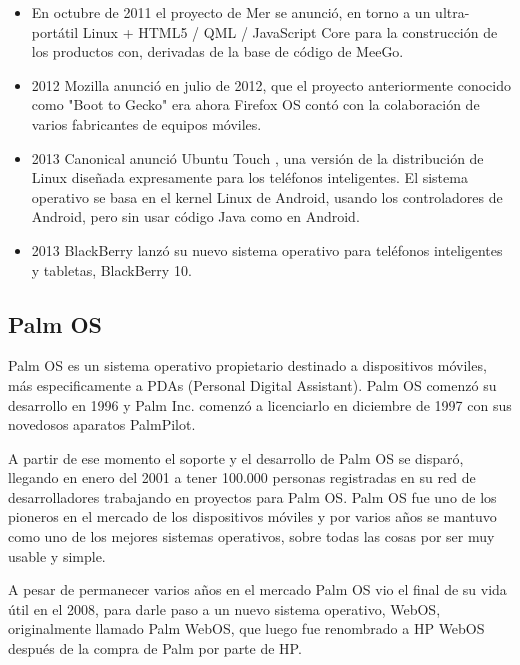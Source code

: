 \begin{itemize}
	\item En octubre de 2011 el proyecto de Mer se anunció, en torno a un ultra-portátil Linux + HTML5 / QML / JavaScript Core para la construcción de los productos con, 	
			derivadas de la base de código de MeeGo. 
	\item 2012 Mozilla anunció en julio de 2012, que el proyecto anteriormente conocido como "Boot to Gecko" era ahora Firefox OS contó con la colaboración de varios 		
			fabricantes de equipos móviles.
	\item 2013 Canonical anunció Ubuntu Touch , una versión de la distribución de Linux diseñada expresamente para los teléfonos inteligentes. El sistema operativo se basa 
			en el kernel Linux de Android, usando los controladores de Android, pero sin usar código Java como en Android.
	\item 2013 BlackBerry lanzó su nuevo sistema operativo para teléfonos inteligentes y tabletas, BlackBerry 10.
\end{itemize}

\subsection*{Palm OS}
Palm OS es un sistema operativo propietario destinado a dispositivos móviles, más especificamente a PDAs (Personal Digital Assistant). Palm OS comenzó su desarrollo en 1996 y Palm Inc. comenzó a licenciarlo en diciembre de 1997 con sus novedosos aparatos PalmPilot.                                               

A partir de ese momento el soporte y el desarrollo de Palm OS se disparó, llegando en enero del 2001 a tener 100.000 personas registradas en su 
red de desarrolladores trabajando en proyectos para Palm OS. Palm OS fue uno de los pioneros en el mercado de los dispositivos móviles y por 
varios años se mantuvo como uno de los mejores sistemas operativos, sobre todas las cosas por ser muy usable y simple.                                                                                                                                                                                    
                                                                                                                                                                              
A pesar de permanecer varios años en el mercado Palm OS vio el final de su vida útil en el 2008, para darle paso a un nuevo sistema operativo, WebOS, originalmente llamado Palm
WebOS, que luego fue renombrado a HP WebOS después de la compra de Palm por parte de HP.

